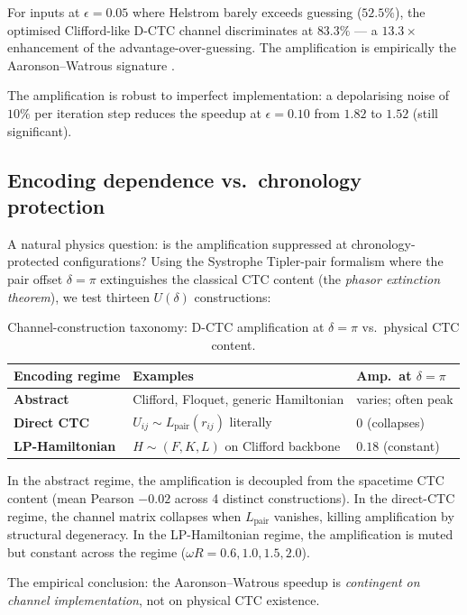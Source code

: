 \documentclass[11pt,a4paper]{article}
\begin{document}
For inputs at $\epsilon = 0.05$ where Helstrom barely exceeds
guessing ($52.5\%$), the optimised Clifford-like D-CTC channel
discriminates at $83.3\%$ --- a $13.3\times$ enhancement of the
advantage-over-guessing. The amplification is empirically the
Aaronson--Watrous signature \cite{AaronsonWatrous2009}.

The amplification is robust to imperfect implementation: a
depolarising noise of $10\%$ per iteration step reduces the
speedup at $\epsilon = 0.10$ from $1.82$ to $1.52$ (still
significant).

\subsection{Encoding dependence vs.\ chronology protection}

A natural physics question: is the amplification suppressed at
chronology-protected configurations? Using the Systrophe Tipler-pair
formalism \cite{Knopp2026Systrophe} where the pair offset
$\delta = \pi$ extinguishes the classical CTC content (the
\emph{phasor extinction theorem}), we test thirteen $U(\delta)$
constructions:

\begin{table}[h]
\centering
\caption{Channel-construction taxonomy: D-CTC amplification at
$\delta = \pi$ vs.\ physical CTC content.}
\label{tab:encoding-taxonomy}
\begin{tabular}{lll}
\toprule
Encoding regime & Examples & Amp.\ at $\delta = \pi$ \\
\midrule
\textbf{Abstract} & Clifford, Floquet, generic Hamiltonian & varies; often peak \\
\textbf{Direct CTC} & $U_{ij} \sim L_{\text{pair}}(r_{ij})$ literally & $0$ (collapses) \\
\textbf{LP-Hamiltonian} & $H \sim (F, K, L)$ on Clifford backbone & $0.18$ (constant) \\
\bottomrule
\end{tabular}
\end{table}

In the abstract regime, the amplification is decoupled from the
spacetime CTC content (mean Pearson $-0.02$ across 4 distinct
constructions). In the direct-CTC regime, the channel matrix
collapses when $L_{\text{pair}}$ vanishes, killing amplification by
structural degeneracy. In the LP-Hamiltonian regime, the
amplification is muted but constant across the regime
($\omega R = 0.6, 1.0, 1.5, 2.0$).

The empirical conclusion: the Aaronson--Watrous speedup is
\emph{contingent on channel implementation}, not on physical
CTC existence.
\end{document}
